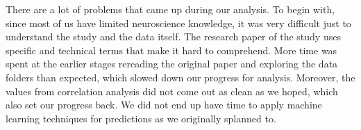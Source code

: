 \documentclass[11pt,twocolumn]{article}
\begin{document}
There are a lot of problems that came up during our analysis. To begin with, 
since most of us have limited neuroscience knowledge, it was very difficult 
just to understand the study and the data itself. The research paper of the 
study uses specific and technical terms that make it hard to comprehend. 
More time was spent at the earlier stages rereading the 
original paper and exploring the data folders than expected, which slowed down 
our progress for analysis. Moreover, the values from correlation analysis 
did not come out as clean as we hoped, which also set our progress back. 
We did not end up have time to apply machine learning techniques for 
predictions as we originally splanned to. \\






\end{document}
